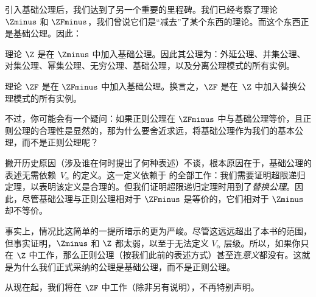 \documentclass[../../../include/open-logic-section]{subfiles}
\begin{document}

引入基础公理后，我们达到了另一个重要的里程碑。我们已经考察了理论 $\Zminus$ 和 $\ZFminus$，我们曾说它们是“减去”了某个东西的理论。而这个东西正是基础公理。因此：

\begin{defn}
理论 $\Z$ 是在 $\Zminus$ 中加入基础公理。因此其公理为：外延公理、并集公理、对集公理、幂集公理、无穷公理、基础公理，以及分离公理模式的所有实例。

理论 $\ZF$ 是在 $\ZFminus$ 中加入基础公理。换言之，$\ZF$ 是在~$\Z$ 中加入替换公理模式的所有实例。
\end{defn}

不过，你可能会有一个疑问：如果正则公理在 $\ZFminus$ 中与基础公理等价，且正则公理的合理性是显然的，那为什么要舍近求远，将基础公理作为我们的基本公理，而不是正则公理呢？

撇开历史原因（涉及谁在何时提出了何种表述）不谈，根本原因在于，基础公理的表述无需依赖~$V_\alpha$ 的定义。这一定义依赖于  的全部工作：我们需要证明超限递归定理，以表明该定义是合理的。但我们证明超限递归定理时用到了\emph{替换公理}。因此，尽管基础公理与正则公理相对于 $\ZFminus$ 是等价的，它们相对于 $\Zminus$ 却不等价。

事实上，情况比这简单的一提所暗示的更为严峻。尽管这远远超出了本书的范围，但事实证明，$\Zminus$ 和 $\Z$ 都太弱，以至于无法定义 $V_\alpha$ 层级。所以，如果你只在 $\Z$ 中工作，那么正则公理（按我们此前的表述方式）甚至连\emph{意义}都没有。这就是为什么我们正式采纳的公理是基础公理，而不是正则公理。

从现在起，我们将在 $\ZF$ 中工作（除非另有说明），不再特别声明。
\end{document}
